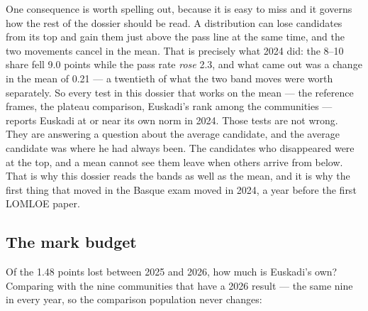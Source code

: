 \documentclass[
  10.5pt,
  a4paper,
  DIV=11,
  numbers=noendperiod]{scrartcl}
\begin{document}
One consequence is worth spelling out, because it is easy to miss and it
governs how the rest of the dossier should be read. A distribution can
lose candidates from its top and gain them just above the pass line at
the same time, and the two movements cancel in the mean. That is
precisely what 2024 did: the 8--10 share fell 9.0 points while the pass
rate \emph{rose} 2.3, and what came out was a change in the mean of 0.21
--- a twentieth of what the two band moves were worth separately. So
every test in this dossier that works on the mean --- the reference
frames, the plateau comparison, Euskadi's rank among the communities ---
reports Euskadi at or near its own norm in 2024. Those tests are not
wrong. They are answering a question about the average candidate, and
the average candidate was where he had always been. The candidates who
disappeared were at the top, and a mean cannot see them leave when
others arrive from below. That is why this dossier reads the bands as
well as the mean, and it is why the first thing that moved in the Basque
exam moved in 2024, a year before the first LOMLOE paper.

\subsection{The mark budget}\label{the-mark-budget}

Of the 1.48 points lost between 2025 and 2026, how much is Euskadi's
own? Comparing with the nine communities that have a 2026 result --- the
same nine in every year, so the comparison population never changes:
\end{document}
